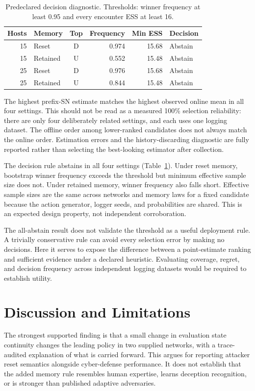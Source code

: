 \documentclass[sigconf,nonacm]{acmart}
\begin{document}
\begin{table}[t]
\centering\small
\setlength{\tabcolsep}{3pt}
\caption{Predeclared decision diagnostic. Thresholds: winner frequency at least 0.95 and every encounter ESS at least 16.}\label{tab:decisions}
\begin{tabular}{rlcrrl}\toprule
Hosts & Memory & Top & Frequency & Min ESS & Decision\\ \midrule
15 & Reset & D & 0.974 & 15.68 & Abstain \\
15 & Retained & U & 0.552 & 15.48 & Abstain \\
25 & Reset & D & 0.976 & 15.68 & Abstain \\
25 & Retained & U & 0.844 & 15.48 & Abstain \\
\bottomrule\end{tabular}
\end{table}
The highest prefix-SN estimate matches the highest observed online mean in all four settings. This should not be read as a measured 100\% selection reliability: there are only four deliberately related settings, and each uses one logging dataset. The offline order among lower-ranked candidates does not always match the online order. Estimation errors and the history-discarding diagnostic are fully reported rather than selecting the best-looking estimator after collection.

The decision rule abstains in all four settings (Table~\ref{tab:decisions}). Under reset memory, bootstrap winner frequency exceeds the threshold but minimum effective sample size does not. Under retained memory, winner frequency also falls short. Effective sample sizes are the same across networks and memory laws for a fixed candidate because the action generator, logger seeds, and probabilities are shared. This is an expected design property, not independent corroboration.

The all-abstain result does not validate the threshold as a useful deployment rule. A trivially conservative rule can avoid every selection error by making no decisions. Here it serves to expose the difference between a point-estimate ranking and sufficient evidence under a declared heuristic. Evaluating coverage, regret, and decision frequency across independent logging datasets would be required to establish utility.

\section{Discussion and Limitations}
The strongest supported finding is that a small change in evaluation state continuity changes the leading policy in two supplied networks, with a trace-audited explanation of what is carried forward. This argues for reporting attacker reset semantics alongside cyber-defense performance. It does not establish that the added memory rule resembles human expertise, learns deception recognition, or is stronger than published adaptive adversaries.
\end{document}
